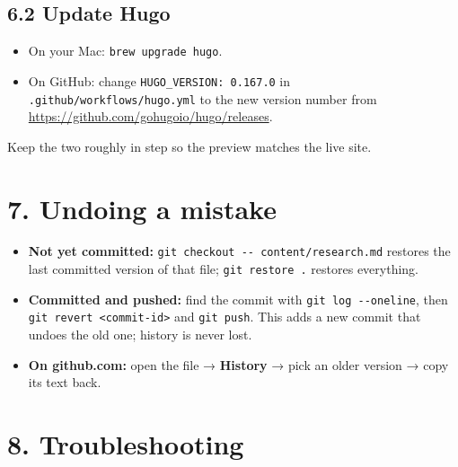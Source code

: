 \documentclass[
  10pt,
]{article}
\providecommand{\tightlist}{%
  \setlength{\itemsep}{0pt}\setlength{\parskip}{0pt}}
\begin{document}
\hypertarget{update-hugo}{%
\subsection{6.2 Update Hugo}\label{update-hugo}}

\begin{itemize}
\tightlist
\item
  On your Mac: \texttt{brew\ upgrade\ hugo}.
\item
  On GitHub: change \texttt{HUGO\_VERSION:\ 0.167.0} in
  \texttt{.github/workflows/hugo.yml} to the new version number from
  \url{https://github.com/gohugoio/hugo/releases}.
\end{itemize}

Keep the two roughly in step so the preview matches the live site.

\hypertarget{undoing-a-mistake}{%
\section{7. Undoing a mistake}\label{undoing-a-mistake}}

\begin{itemize}
\tightlist
\item
  \textbf{Not yet committed:}
  \texttt{git\ checkout\ -\/-\ content/research.md} restores the last
  committed version of that file; \texttt{git\ restore\ .} restores
  everything.
\item
  \textbf{Committed and pushed:} find the commit with
  \texttt{git\ log\ -\/-oneline}, then
  \texttt{git\ revert\ \textless{}commit-id\textgreater{}} and
  \texttt{git\ push}. This adds a new commit that undoes the old one;
  history is never lost.
\item
  \textbf{On github.com:} open the file → \textbf{History} → pick an
  older version → copy its text back.
\end{itemize}

\hypertarget{troubleshooting}{%
\section{8. Troubleshooting}\label{troubleshooting}}
\end{document}
